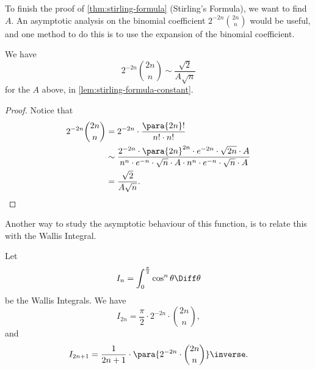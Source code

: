 To finish the proof of \autoref{thm:stirling-formula} (Stirling's Formula), we want to find \(A\). An asymptotic analysis on the binomial coefficient \(2^{-2n} \binom{2n}{n}\) would be useful, and one method to do this is to use the expansion of the binomial coefficient.

\begin{lemma}
    \label{lem:asymptotic-binomial-factorial}%
    We have
    \[
        2^{-2n} \binom{2n}{n} \sim \frac{\sqrt{2}}{A \sqrt{n}}
    \]
    for the \(A\) above, in \autoref{lem:stirling-formula-constant}.
\end{lemma}

\begin{proof}
    Notice that
    \begin{align*}
        2^{-2n} \binom{2n}{n} &= 2^{-2n} \cdot \frac{\para{2n}!}{n! \cdot n!} \\
        &\sim \frac{2^{-2n} \cdot \para{2n}^{2n} \cdot e^{-2n} \cdot \sqrt{2n} \cdot A}{n^n \cdot e^{-n} \cdot \sqrt{n} \cdot A \cdot n^n \cdot e^{-n} \cdot \sqrt{n} \cdot A} \\
        &= \frac{\sqrt{2}}{A \sqrt{n}}.
    \end{align*}
\end{proof}

Another way to study the asymptotic behaviour of this function, is to relate this with the Wallis Integral.

\begin{lemma}
    \label{lem:wallis-integral}%
    Let
    \[
        I_n = \int_{0}^{\frac{\pi}{2}} \cos^n \theta \Diff \theta
    \]
    be the Wallis Integrals. We have
    \[
        I_{2n} = \frac{\pi}{2} \cdot 2^{-2n} \cdot \binom{2n}{n},
    \]
    and
    \[
        I_{2n + 1} = \frac{1}{2n + 1} \cdot \para{2^{-2n} \cdot \binom{2n}{n}}\inverse.
    \]
\end{lemma}

